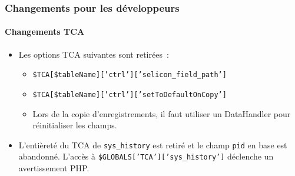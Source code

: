 \begin{frame}[fragile]
	\frametitle{Changements pour les développeurs}
	\framesubtitle{Changements TCA}

	\begin{itemize}
		\item Les options TCA suivantes sont retirées~:

			\begin{itemize}
				\item \texttt{\$TCA[\$tableName]['ctrl']['selicon\_field\_path']}
				\item \texttt{\$TCA[\$tableName]['ctrl']['setToDefaultOnCopy']}
			\end{itemize}

			\begin{itemize}\smaller
				\item[\ding{228}] Lors de la copie d'enregistrements, il faut utiliser un DataHandler pour réinitialiser les champs.
			\end{itemize}\normalsize

		\item L'entièreté du TCA de \texttt{sys\_history} est retiré et le champ \texttt{pid} en base est abandonné.
			L'accès à \texttt{\$GLOBALS['TCA']['sys\_history']} déclenche un avertissement PHP.

	\end{itemize}

\end{frame}


